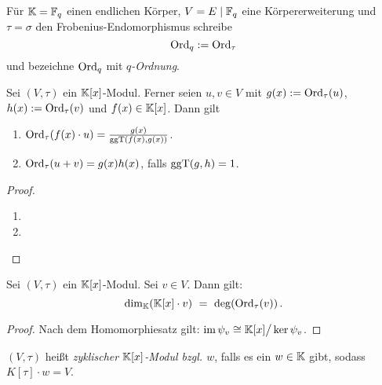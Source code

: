 \begin{notation}
  Für $\mathbb{K} = \mathbb{F}_q$ einen endlichen Körper, $V = E \mid \mathbb{F}_q$ eine 
  Körpererweiterung und $\tau = \sigma$ den Frobenius-Endomorphismus schreibe
  \[ \operatorname{Ord}_q := \operatorname{Ord}_\tau \]
  und bezeichne $\operatorname{Ord}_q$ mit \emph{$q$-Ordnung}.
\end{notation}

\begin{lemma}
  \label{lemma:eigenschaften_tau_ordnung}
  Sei $(V,\tau)$ ein $\mathbb{K}[x]$-Modul. Ferner seien
  $u,v\in V$ mit $g(x) := \operatorname{Ord}_\tau(u)$, $h(x) := \operatorname{Ord}_\tau(v)$ und 
  $f(x) \in \mathbb{K}[x]$. Dann gilt
  \begin{enumerate}
    \item $\operatorname{Ord}_\tau(f(x)\cdot u) = \frac{g(x)}{\operatorname{ggT}(f(x),g(x))}$.
    \item $\operatorname{Ord}_\tau(u+v) = g(x)h(x)$, falls $\operatorname{ggT}(g,h) = 1$.
  \end{enumerate}
\end{lemma}
\begin{proof}
  \begin{enumerate}
    \item \TODO
    \item \TODO
  \end{enumerate}
\end{proof}

\begin{lemma}
  Sei $(V,\tau)$ ein $\mathbb{K}[x]$-Modul. Sei $v\in V$. Dann gilt:
  \[ \dim_\mathbb{K}( \mathbb{K}[x]\cdot v ) \ =\  \deg( \operatorname{Ord}_\tau(v) )\,.\]
\end{lemma}
\begin{proof}
  Nach dem Homomorphiesatz gilt: 
  $ \operatorname{im}\psi_v \cong \mathbb{K}[x] \big/ \ker \psi_v$.
\end{proof}


\begin{definition}
  $(V,\tau)$ heißt \emph{zyklischer $\mathbb{K}[x]$-Modul bzgl. $w$}, falls es ein 
  $w\in \mathbb{K}$ gibt, sodass $K[\tau]\cdot w = V$.
\end{definition}


